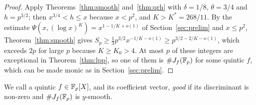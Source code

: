 \begin{proof}
Apply Theorems~\ref{thm:smooth} and~\ref{thm:qrh} with $\delta=1/8$, $\theta=3/4$ and $h=p^{3/2}$; then
$x^{3/4}<h\le x$ because $x<p^2$, and $K>K^*=268/11$. By the estimate
$\Psi(x,(\log x)^K)=x^{1-1/K+o(1)}$ of Section~\ref{sec:prelim} and $x\le p^2$, Theorem~\ref{thm:smooth} gives
$S_p\ge\tfrac13p^{3/2}x^{-1/K-o(1)}\ge p^{3/2-2/K-o(1)}$, which exceeds $2p$ for large $p$ because
$K\ge K_0>4$. At most $p$ of these integers are exceptional in Theorem~\ref{thm:lpp}, so one of them is
$\#J_f(\mathbb{F}_p)$ for some quintic $f$, which can be made monic as in Section~\ref{sec:prelim}.
\end{proof}

We call a quintic $f\in\mathbb{F}_p[X]$, and its coefficient vector, \emph{good} if its discriminant is non-zero and
$\#J_f(\mathbb{F}_p)$ is $y$-smooth.
